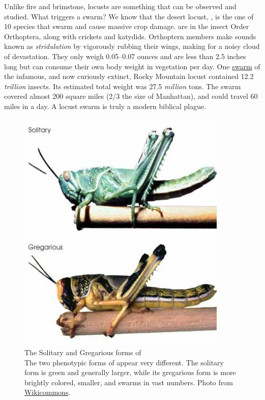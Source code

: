   Unlike fire and brimstone, locusts are something that can be observed and studied. What triggers a swarm? We know that the desert locust, \locusts{}, is the one of 10 species that swarm and cause massive crop damage. \locusts{} are in the insect Order Orthoptera, along with crickets and katydids. Orthoptern members make sounds known as \textit{stridulation} by vigorously rubbing their wings, making for a noisy cloud of devastation. They only weigh 0.05--0.07 ounces and are less than 2.5 inches long but can consume their own body weight in vegetation per day. One \href{http://animaldiversity.ummz.umich.edu/site/accounts/information/Melanoplus_spretus.html}{swarm} of the infamous, and now curiously extinct, Rocky Mountain locust contained 12.2 \textit{trillion} insects. Its estimated total weight was 27.5 \textit{million} tons. The swarm covered almost 200 square miles (2/3 the size of Manhattan), and could travel 60 miles in a day. A locust swarm is truly a modern biblical plague.

  \begin{figure} %
    \centering
    \includegraphics[width=10cm,keepaspectratio]{Figures/Intro/DesertLocust.jpeg}
    \caption[The Solitary and Gregarious forms of \locusts{}]
    {
      The Solitary and Gregarious forms of \locusts{}\\[0.25cm]
      The two phenotypic forms of \locusts{} appear very different. The solitary form is green and generally larger, while its gregarious form is more brightly colored, smaller, and swarms in vast numbers. Photo from \href{http://www.wikicommons.com}{Wikicommons}.
      }
    \label{Intro:fig:Locust}
    \end{figure}

